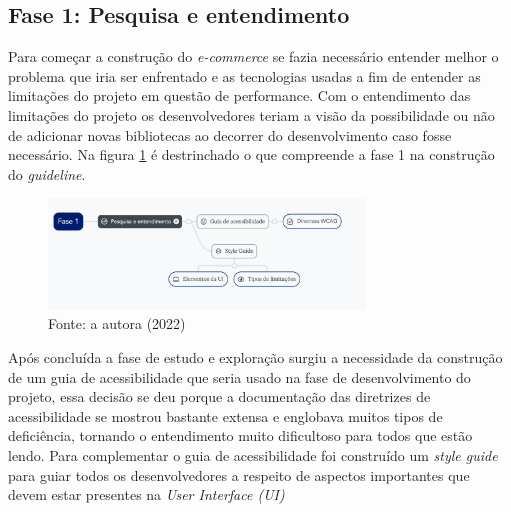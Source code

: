 {}

\subsection{Fase 1: Pesquisa e entendimento}
{
Para começar a construção do \textit{e-commerce} se fazia necessário entender melhor o problema que iria ser enfrentado e as tecnologias usadas a fim de entender as limitações do projeto em questão de performance. Com o entendimento das limitações do projeto os desenvolvedores teriam a visão da possibilidade ou não de adicionar novas bibliotecas ao decorrer do desenvolvimento caso fosse necessário. Na figura \ref{fig:guideline-f1} é destrinchado o que compreende a fase 1 na construção do \textit{guideline}.

\newpage


\begin{figure}[ht]
  	\centering
    \includegraphics[width=0.75\textwidth]{images/guideline-f1.png}
    \caption{Fase 1 do Guideline}
    \caption*{Fonte: a autora (2022)}
    \label{fig:guideline-f1}
\end{figure} 


Após concluída a fase de estudo e exploração surgiu a necessidade da construção de um guia de acessibilidade que seria usado na fase de desenvolvimento do projeto, essa decisão se deu porque a documentação das diretrizes de acessibilidade se mostrou bastante extensa e englobava muitos tipos de deficiência, tornando o entendimento muito dificultoso para todos que estão lendo. Para complementar o guia de acessibilidade foi construído um \textit{style guide} para guiar todos os desenvolvedores a respeito de aspectos importantes que devem estar presentes na \textit{User Interface (UI)}}

